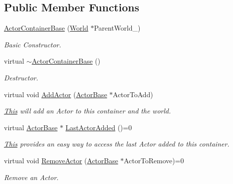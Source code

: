 \subsection*{Public Member Functions}
\begin{DoxyCompactItemize}
\item 
\hyperlink{classphys_1_1ActorContainerBase_a629529f9002646d463ea167af1d20df2}{ActorContainerBase} (\hyperlink{classphys_1_1World}{World} $\ast$ParentWorld\_\-)
\begin{DoxyCompactList}\small\item\em Basic Constructor. \item\end{DoxyCompactList}\item 
virtual \hyperlink{classphys_1_1ActorContainerBase_aa5eac062dd70a220a4ec6df973c6f258}{$\sim$ActorContainerBase} ()
\begin{DoxyCompactList}\small\item\em Destructor. \item\end{DoxyCompactList}\item 
virtual void \hyperlink{classphys_1_1ActorContainerBase_af32c2adf4c0f928604ce05e20b07ef66}{AddActor} (\hyperlink{classphys_1_1ActorBase}{ActorBase} $\ast$ActorToAdd)
\begin{DoxyCompactList}\small\item\em \hyperlink{structThis}{This} will add an Actor to this container and the world. \item\end{DoxyCompactList}\item 
virtual \hyperlink{classphys_1_1ActorBase}{ActorBase} $\ast$ \hyperlink{classphys_1_1ActorContainerBase_a6ccc6d058bcbbe0b9a638e28fb136477}{LastActorAdded} ()=0
\begin{DoxyCompactList}\small\item\em \hyperlink{structThis}{This} provides an easy way to access the last Actor added to this container. \item\end{DoxyCompactList}\item 
virtual void \hyperlink{classphys_1_1ActorContainerBase_a579e049a3190fcc1f951b3212c209616}{RemoveActor} (\hyperlink{classphys_1_1ActorBase}{ActorBase} $\ast$ActorToRemove)=0
\begin{DoxyCompactList}\small\item\em Remove an Actor. \item\end{DoxyCompactList}\item 

\end{DoxyCompactItemize}
